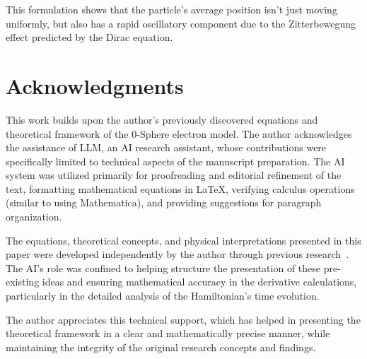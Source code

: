 \documentclass[%
 reprint,
 amsmath,amssymb,
 aps,
]{revtex4-1}
\numberwithin{equation}{section}%
\begin{document}
This formulation shows that the particle's average position isn't just moving uniformly, but also has a rapid oscillatory component due to the Zitterbewegung effect predicted by the Dirac equation.


\section*{Acknowledgments}
This work builds upon the author's previously discovered equations and theoretical framework of the 0-Sphere electron model. The author acknowledges the assistance of LLM, an AI research assistant, whose contributions were specifically limited to technical aspects of the manuscript preparation. The AI system was utilized primarily for proofreading and editorial refinement of the text, formatting mathematical equations in LaTeX, verifying calculus operations (similar to using Mathematica), and providing suggestions for paragraph organization.

The equations, theoretical concepts, and physical interpretations presented in this paper were developed independently by the author through previous research~\cite{hanamura2018, hanamura2020, hanamura2023}. The AI's role was confined to helping structure the presentation of these pre-existing ideas and ensuring mathematical accuracy in the derivative calculations, particularly in the detailed analysis of the Hamiltonian's time evolution.

The author appreciates this technical support, which has helped in presenting the theoretical framework in a clear and mathematically precise manner, while maintaining the integrity of the original research concepts and findings.

\end{document}
